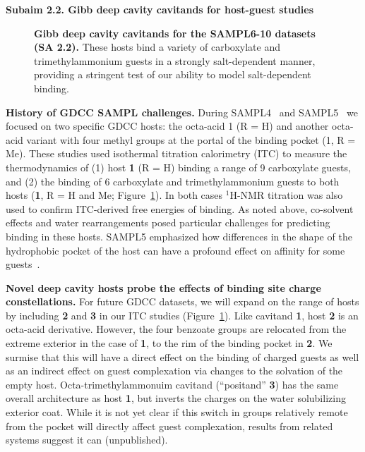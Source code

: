 \documentclass[11pt]{article}
\begin{document}
\textbf{Subaim 2.2. Gibb deep cavity cavitands for host-guest studies} 


\begin{figure}[h]
\begin{centering}

\end{centering}

\vspace{-0.1in}
\caption{\footnotesize {\bf Gibb deep cavity cavitands for the SAMPL6-10 datasets (SA 2.2).} These hosts bind a variety of carboxylate and trimethylammonium guests in a strongly salt-dependent manner, providing a stringent test of our ability to model salt-dependent binding.
\label{figure:gdccs}
\vspace{-0.2in}
}
\end{figure}

{\bf History of GDCC SAMPL challenges.} During SAMPL4~\cite{gibb_binding_2013} and SAMPL5~\cite{sullivan_binding_2016} we focused on two specific GDCC hosts: the octa-acid 1 (R = H) and another octa-acid variant with four methyl groups at the portal of the binding pocket (1, R = Me). 
These studies used isothermal titration calorimetry (ITC) to measure the thermodynamics of (1) host {\bf 1} (R = H) binding a range of 9 carboxylate guests,
and (2) the binding of 6 carboxylate and trimethylammonium guests to both hosts ({\bf 1}, R = H and Me; Figure~\ref{figure:gdccs}).  
In both cases $^1$H-NMR titration was also used to confirm ITC-derived free energies of binding.  
As noted above, co-solvent effects and water rearrangements posed particular challenges for predicting binding in these hosts. 
SAMPL5 emphasized how differences in the shape of the hydrophobic pocket of the host can have a profound effect on affinity for some guests~\cite{yin_overview_2016}.

{\bf Novel deep cavity hosts probe the effects of binding site charge constellations.} 
For future GDCC datasets, we will expand on the range of hosts by including {\bf 2} and {\bf 3} in our ITC studies (Figure~\ref{figure:gdccs}).  
Like cavitand {\bf 1}, host {\bf 2} is an octa-acid derivative.  However, the four benzoate groups are relocated from the extreme exterior in the case of {\bf 1}, to the rim of the binding pocket in {\bf 2}.  
We surmise that this will have a direct effect on the binding of charged guests as well as an indirect effect on guest complexation via changes to the solvation of the empty host.  
Octa-trimethylammonuim cavitand (``positand'' {\bf 3}) has the same overall architecture as host {\bf 1}, but inverts the charges on the water solubilizing exterior coat.  
While it is not yet clear if this switch in groups relatively remote from the pocket will directly affect guest complexation, results from related systems suggest it can (unpublished). 
\end{document}

